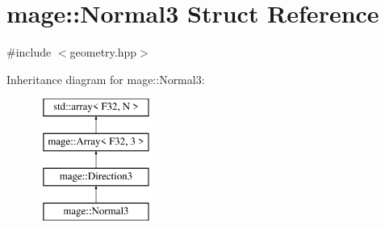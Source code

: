 \hypertarget{structmage_1_1_normal3}{}\section{mage\+:\+:Normal3 Struct Reference}
\label{structmage_1_1_normal3}


{\ttfamily \#include $<$geometry.\+hpp$>$}

Inheritance diagram for mage\+:\+:Normal3\+:\begin{figure}[H]
\begin{center}
\leavevmode
\includegraphics[height=4.000000cm]{structmage_1_1_normal3}
\end{center}
\end{figure}

